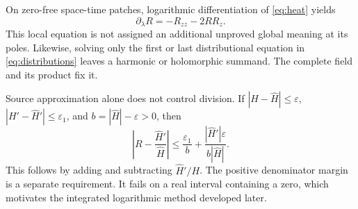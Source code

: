 On zero-free space-time patches, logarithmic differentiation of
\eqref{eq:heat} yields
\begin{equation}\label{eq:burgers}
 \partial_\lambda R=-R_{zz}-2RR_z.
\end{equation}
This local equation is not assigned an additional unproved global
meaning at its poles. Likewise, solving only the first or last
distributional equation in \eqref{eq:distributions} leaves a harmonic
or holomorphic summand. The complete field and its product fix it.

Source approximation alone does not control division. If
\(|H-\widehat H|\le\varepsilon\),
\(|H'-\widehat H'|\le\varepsilon_1\), and
\(b=|\widehat H|-\varepsilon>0\), then
\begin{equation}\label{eq:ratio-error}
 \left|R-\frac{\widehat H'}{\widehat H}\right|
 \le\frac{\varepsilon_1}{b}
       +\frac{|\widehat H'|\varepsilon}{b|\widehat H|}.
\end{equation}
This follows by adding and subtracting
\(\widehat H'/H\). The positive denominator margin is a separate
requirement. It fails on a real interval containing a zero, which
motivates the integrated logarithmic method developed later.

